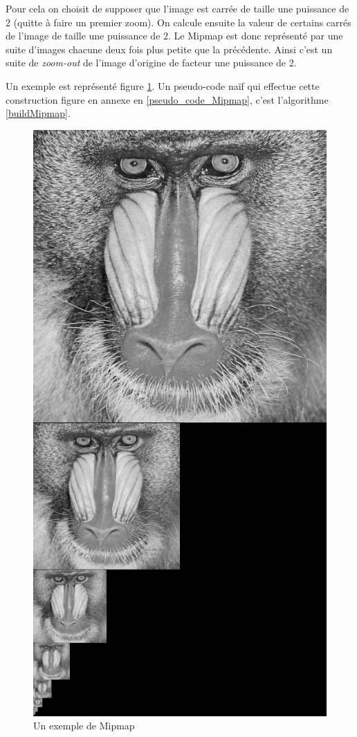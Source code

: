Pour cela on choisit de supposer que l'image est carrée de taille une puissance de 2 (quitte à faire un premier zoom). On calcule ensuite la valeur de certains carrés de l'image de taille une puissance de 2.
Le Mipmap est donc représenté par une suite d'images chacune deux fois plus petite que la précédente. Ainsi c'est un suite de \emph{zoom-out} de l'image d'origine de facteur une puissance de 2. 

Un exemple est représenté figure \ref{MipMap_real}. Un pseudo-code naïf qui effectue cette construction figure en annexe en \ref{pseudo_code_Mipmap}, c'est l'algorithme \ref{buildMipmap}.

\begin{figure}[h!]
\centering
\includegraphics[scale=0.4]{MipMap_real} %
\caption{Un exemple de Mipmap}
\label{MipMap_real}
\end{figure}

